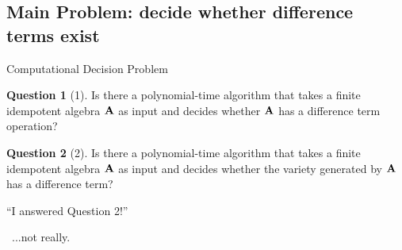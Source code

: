 \documentclass[notes=hide,12pt,xcolor=dvipsnames%
   ]{beamer}
\theoremstyle{definition}
\newtheorem{question}{Question}
\begin{document}
\subsection{Main Problem: decide whether difference terms exist}

\begin{frame}[label=computational]{Computational Decision Problem}

  \begin{question}[1]
    \label{prob:2}
    Is there a polynomial-time algorithm that takes a finite
    idempotent algebra $\mathbf{A}$ as input and decides whether 
    $\mathbf{A}$ has a difference term operation?
  \end{question}

  \pause
  \begin{question}[2]
  \label{prob:1}
  Is there a polynomial-time algorithm that takes a finite
  idempotent algebra $\mathbf{A}$ as input and decides whether the variety generated by
  $\mathbf{A}$ has a difference term?
  \end{question}

\end{frame}

\begin{frame}[label=premature]{}

  \begin{center}
    ``I answered Question 2!''


    \pause
    ~\phantom{XXXXXXXXXXX}...not really.
  \end{center}
\end{frame}
\begin{frame}[label=premature]{}

  \begin{center}
    \pause
  \end{center}
\end{frame}



\end{document}
